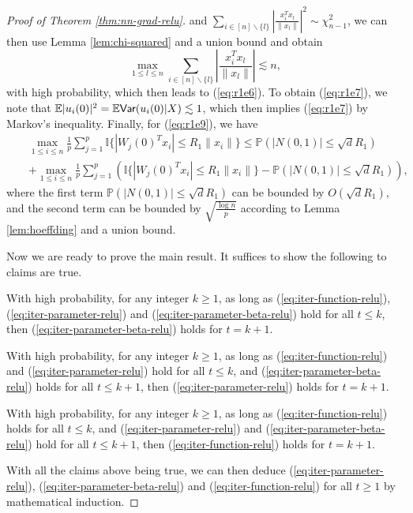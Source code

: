 \begin{proof}[Proof of Theorem \ref{thm:nn-grad-relu}]
and $\sum_{i\in[n]\backslash\{l\}}\left|\frac{x_i^Tx_l}{\|x_l\|}\right|^2\sim \chi_{n-1}^2$, we can then use Lemma \ref{lem:chi-squared} and a union bound and obtain
$$\max_{1\leq l\leq n}\sum_{i\in[n]\backslash\{l\}}\left|\frac{x_i^Tx_l}{\|x_l\|}\right|\lesssim n,$$
with high probability, which then leads to (\ref{eq:r1e6}). To obtain (\ref{eq:r1e7}), we note that $\mathbb{E}|u_i(0)|^2 = \mathbb{E}\textsf{Var}(u_i(0)|X) \lesssim 1$, which then implies (\ref{eq:r1e7}) by Markov's inequality. Finally, for (\ref{eq:r1e9}), we have
\begin{eqnarray*}
&&\max_{1\leq i\leq n}\frac{1}{p}\sum_{j=1}^p\mathbb{I}\{|W_j(0)^Tx_i|\leq R_1\|x_i\|\} \leq \mathbb{P}\left(|N(0,1)|\leq \sqrt{d}R_1\right) \\
&&+ \max_{1\leq i\leq n}\frac{1}{p}\sum_{j=1}^p\left(\mathbb{I}\{|W_j(0)^Tx_i|\leq R_1\|x_i\|\}-\mathbb{P}\left(|N(0,1)|\leq \sqrt{d}R_1\right)\right),
\end{eqnarray*}
where the first term $\mathbb{P}\left(|N(0,1)|\leq \sqrt{d}R_1\right)$ can be bounded by $O(\sqrt{d}R_1)$, and the second term can be bounded by $\sqrt{\frac{\log n}{p}}$ according to Lemma \ref{lem:hoeffding} and a union bound.

Now we are ready to prove the main result. It suffices to show the following to claims are true.
\begin{thm1}
With high probability, for any integer $k\geq 1$, as long as (\ref{eq:iter-function-relu}), (\ref{eq:iter-parameter-relu}) and (\ref{eq:iter-parameter-beta-relu}) hold for all $t\leq k$, then (\ref{eq:iter-parameter-beta-relu}) holds for $t=k+1$.
\end{thm1}
\begin{thm2}
With high probability, for any integer $k\geq 1$, as long as (\ref{eq:iter-function-relu}) and (\ref{eq:iter-parameter-relu}) hold for all $t\leq k$, and (\ref{eq:iter-parameter-beta-relu}) holds for all $t\leq k+1$, then (\ref{eq:iter-parameter-relu}) holds for $t=k+1$.
\end{thm2}
\begin{thm3}
With high probability, for any integer $k\geq 1$, as long as (\ref{eq:iter-function-relu}) holds for all $t\leq k$, and (\ref{eq:iter-parameter-relu}) and (\ref{eq:iter-parameter-beta-relu}) hold for all $t\leq k+1$, then (\ref{eq:iter-function-relu}) holds for $t=k+1$.
\end{thm3}
\noindent With all the claims above being true, we can then deduce (\ref{eq:iter-parameter-relu}), (\ref{eq:iter-parameter-beta-relu}) and (\ref{eq:iter-function-relu}) for all $t\geq 1$ by mathematical induction.


\end{proof}
